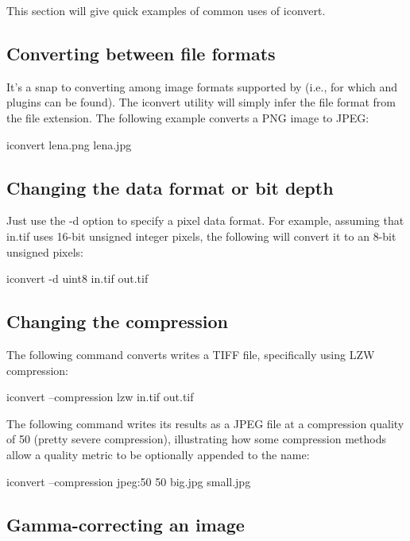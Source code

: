 This section will give quick examples of common uses of {\cf iconvert}.

\subsection*{Converting between file formats}

It's a snap to converting among image formats supported by \product
(i.e., for which \ImageInput and \ImageOutput plugins can be found).
The {\cf iconvert} utility will simply infer the file format from the
file extension. The following example converts a PNG image to JPEG:

\begin{code}
    iconvert lena.png lena.jpg
\end{code}

\subsection*{Changing the data format or bit depth}

Just use the {\cf -d} option to specify a pixel data format.  For
example, assuming that {\cf in.tif} uses 16-bit unsigned integer
pixels, the following will convert it to an 8-bit unsigned pixels:

\begin{code}
    iconvert -d uint8 in.tif out.tif
\end{code}

\subsection*{Changing the compression}

The following command converts writes a TIFF file, specifically using
LZW compression:

\begin{code}
    iconvert --compression lzw in.tif out.tif
\end{code}

The following command writes its results as a JPEG file at a compression
quality of 50 (pretty severe compression), illustrating how some compression
methods allow a quality metric to be optionally appended to the name:

\begin{code}
    iconvert --compression jpeg:50 50 big.jpg small.jpg
\end{code}

\subsection*{Gamma-correcting an image}


